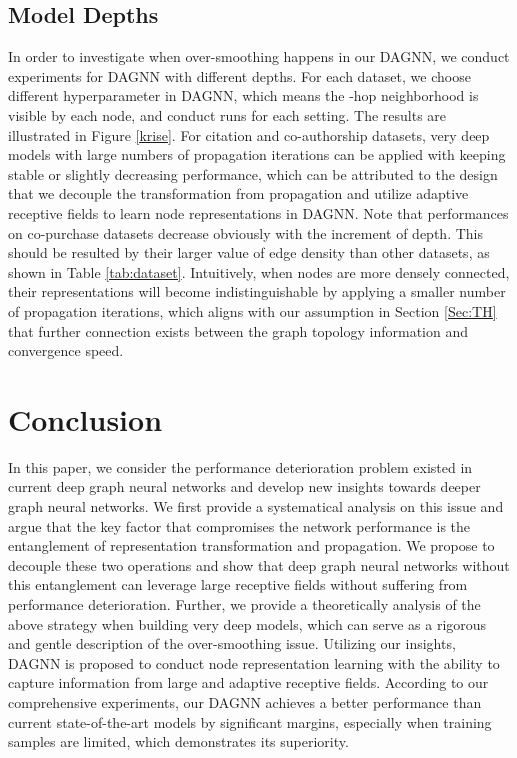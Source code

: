 \documentclass[sigconf]{acmart}
\begin{document}
\subsection{Model Depths}
In order to investigate when over-smoothing happens in our DAGNN,
we conduct experiments for DAGNN with different depths. For each
dataset, we choose different hyperparameter  in DAGNN, which
means the -hop neighborhood is visible by each node, and
conduct  runs for each setting. The results are illustrated
in Figure \ref{krise}. For citation and co-authorship datasets,
very deep models with large numbers of propagation iterations can
be applied with keeping stable or slightly decreasing
performance, which can be attributed to the design that we
decouple the transformation from propagation and utilize adaptive
receptive fields to learn node representations in DAGNN. Note that
performances on co-purchase datasets decrease obviously with the
increment of depth. This should be resulted by their larger value
of edge density than other datasets, as shown in Table
\ref{tab:dataset}. Intuitively, when nodes are more densely
connected, their representations will become indistinguishable by
applying a smaller number of propagation iterations, which aligns
with our assumption in Section \ref{Sec:TH} that further
connection exists between the graph topology information and convergence
speed.




\section{Conclusion}

In this paper, we consider the performance deterioration problem existed in current deep
graph neural networks and develop new insights towards deeper graph
neural networks. We first provide a systematical analysis on this issue
and argue that the key factor that compromises the network
performance is the entanglement of representation transformation and
propagation. We propose to decouple these two operations and show
that deep graph neural networks without this entanglement can
leverage large receptive fields without suffering from
performance deterioration. Further, we provide a theoretically analysis of the above strategy when building very deep models, which can
serve as a rigorous and gentle description of the over-smoothing
issue. Utilizing our insights, DAGNN is proposed to conduct node
representation learning with the ability to capture information
from large and adaptive receptive fields. According to our
comprehensive experiments, our DAGNN achieves a better performance
than current state-of-the-art models by significant margins,
especially when training samples are limited, which demonstrates
its superiority.
\end{document}
